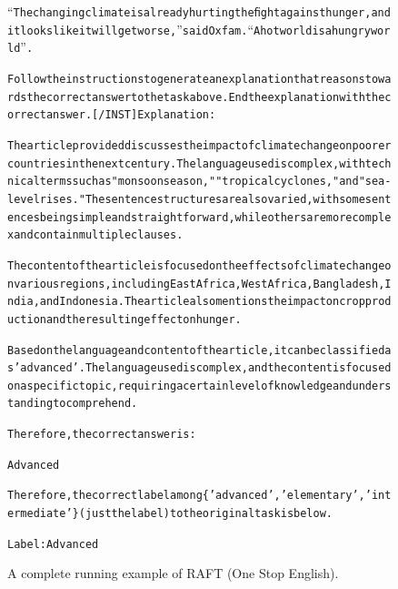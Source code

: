 \begin{figure}[t]
{{\begin{alltt}
“The changing climate is already hurting the ﬁght against hunger, and it looks like it will get worse,” said Oxfam. “A hot world is a hungry world”.

Follow the instructions to generate an explanation that reasons towards the correct answer to the task above. End the explanation with the correct answer. [/INST] Explanation: 

The article provided discusses the impact of climate change on poorer countries in the next century. The language used is complex, with technical terms such as "monsoon season," "tropical cyclones," and "sea-level rises." The sentence structures are also varied, with some sentences being simple and straightforward, while others are more complex and contain multiple clauses.

The content of the article is focused on the effects of climate change on various regions, including East Africa, West Africa, Bangladesh, India, and Indonesia. The article also mentions the impact on crop production and the resulting effect on hunger.

Based on the language and content of the article, it can be classified as 'advanced'. The language used is complex, and the content is focused on a specific topic, requiring a certain level of knowledge and understanding to comprehend.

Therefore, the correct answer is:

Advanced

Therefore, the correct label among \{'advanced', 'elementary', 'intermediate'\} (just the label) to the original task is below.

Label: Advanced
\end{alltt}
}}
\caption{A complete running example of RAFT (One Stop English).}
\label{fig:raft_subset=one_stop_english_example}
\end{figure}
